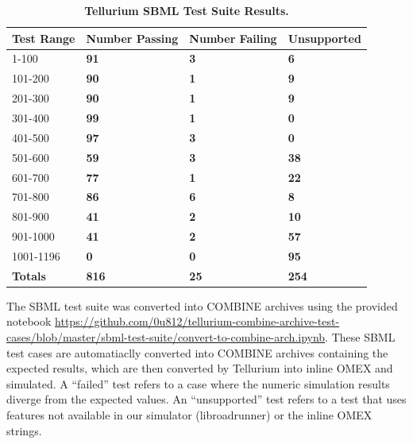 \documentclass[10pt,letterpaper]{article}
\newlength\savedwidth
\newcommand\thickhline{\noalign{\global\savedwidth\arrayrulewidth\global\arrayrulewidth 2pt}%
\hline
\noalign{\global\arrayrulewidth\savedwidth}}
\begin{document}
\begin{table}[!ht]
\centering
\caption{
{\bf Tellurium SBML Test Suite Results.} }
\begin{tabular}{l|l|l|l|}
\hline
{\bf Test Range} & {\bf Number Passing} & {\bf Number Failing} & {\bf Unsupported}\\ \hline %
  1-100  & \textbf{91} & \textbf{3} & \textbf{ 6} \\ \hline
101-200  & \textbf{90} & \textbf{1} & \textbf{ 9} \\ \hline
201-300  & \textbf{90} & \textbf{1} & \textbf{ 9} \\ \hline
301-400  & \textbf{99} & \textbf{1} & \textbf{ 0} \\ \hline
401-500  & \textbf{97} & \textbf{3} & \textbf{ 0} \\ \hline
501-600  & \textbf{59} & \textbf{3} & \textbf{38} \\ \hline
601-700  & \textbf{77} & \textbf{1} & \textbf{22} \\ \hline
701-800  & \textbf{86} & \textbf{6} & \textbf{ 8} \\ \hline
801-900  & \textbf{41} & \textbf{2} & \textbf{10} \\ \hline
901-1000 & \textbf{41} & \textbf{2} & \textbf{57} \\ \hline
1001-1196& \textbf{ 0} & \textbf{0} & \textbf{95} \\ \hline
\textbf{Totals}& \textbf{816} & \textbf{25} & \textbf{254} \\ \hline
\end{tabular}
\begin{flushleft} The SBML test suite was converted into COMBINE archives using the provided notebook \href{https://github.com/0u812/tellurium-combine-archive-test-cases/blob/master/sbml-test-suite/convert-to-combine-arch.ipynb}{https://github.com/0u812/tellurium-combine-archive-test-cases/blob/master/sbml-test-suite/convert-to-combine-arch.ipynb}. These SBML test cases are automatiaclly converted into COMBINE archives containing the expected results, which are then converted by Tellurium into inline OMEX and simulated. A ``failed'' test refers to a case where the numeric simulation results diverge from the expected values. An ``unsupported'' test refers to a test that uses features not available in our simulator (libroadrunner) or the inline OMEX strings.
\end{flushleft}
\label{sbmlbenchmark}
\end{table}
\end{document}
